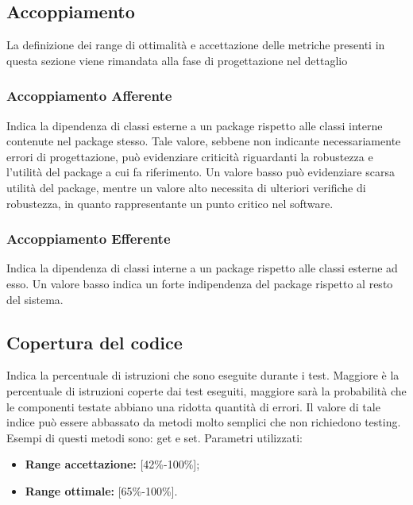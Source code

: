 \subsection{Accoppiamento}
La definizione dei range di ottimalità e accettazione delle metriche presenti in questa sezione viene rimandata alla fase di progettazione nel dettaglio 
\subsubsection{Accoppiamento Afferente}
Indica la dipendenza di classi esterne a un package rispetto alle classi interne contenute nel package stesso.
Tale valore, sebbene non indicante necessariamente errori di progettazione, può evidenziare criticità riguardanti la robustezza e l'utilità del package a
cui fa riferimento.
Un valore basso può evidenziare scarsa utilità del package, mentre un valore alto necessita di ulteriori verifiche di robustezza, in quanto rappresentante un punto critico nel software.
\subsubsection{Accoppiamento Efferente}
Indica la dipendenza di classi interne a un package rispetto alle classi esterne ad esso.
Un valore basso indica un forte indipendenza del package rispetto al resto del sistema.

\subsection{Copertura del codice}
Indica la percentuale di istruzioni che sono eseguite durante i test.
Maggiore è la percentuale di istruzioni coperte dai test eseguiti, maggiore sarà la probabilità che le componenti testate abbiano una ridotta quantità di errori.
Il valore di tale indice può essere abbassato da metodi molto semplici che non richiedono
testing. Esempi di questi metodi sono: get e set.
Parametri utilizzati:

\begin{itemize}
	
	\item \textbf{Range accettazione:} [42\%-100\%];
	\item \textbf{Range ottimale:} [65\%-100\%].
	
\end{itemize}


